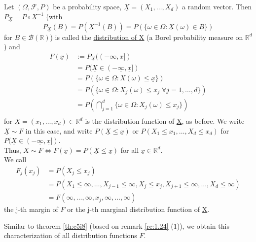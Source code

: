 \documentclass{article}
\newcommand{\R}{\mathbb{R}}
\newcommand{\inv}{^{-1}}
\begin{document}
	\begin{mydef}{}{}
		Let $(\Omega, \mathcal{F}, P)$ be a probability space, $\underline{X}=(X_1, \dots, X_d)$ a random vector. Then $P_{\underline{X}}=P\circ\underline{X}\inv$ (with $$P_{\underline{X}}(B)=P(\underline{X}\inv(B))=P(\{\omega\in\Omega : \underline{X}(\omega)\in B\})$$ for $B\in\mathcal{B}(\R)$) is called the \underline{distribution of \underline{X}} (a Borel probability measure on $\R^d$) and
		\begin{align*}
			F(\underline{x})&:=P_{\underline{X}}((-\infty, x])\\
			&=P(\underline{X}\in(-\underline{\infty}, \underline{x}])\\
			&=P(\{\omega\in\Omega : X(\omega)\leq\underline{x}\})\\
			&=P(\{\omega\in\Omega : X_j(\omega)\leq x_j\;\forall j=1, \dots, d\})\\
			&=P(\bigcap_{j=1}^{d}\{\omega\in\Omega : X_j(\omega)\leq x_j\})\\
		\end{align*}
		for $\underline{X}=(x_1, \dots, x_d)\in\R^d$ is the distribution function of \underline{X}, as before. We write $\underline{X}\sim F$ in this case, and write $P(\underline{X}\leq\underline{x})$ or $P(X_1\leq x_1, \dots, X_d\leq x_d)$ for $P(\underline{X}\in(-\underline{\infty}, \underline{x}])$.\\
		
		Thus, $X\sim F\Leftrightarrow F(\underline{x})=P(\underline{X}\leq\underline{x})$ for all $\underline{x}\in\R^d$.\\
		
		We call
		\begin{align*}
			F_j(x_j)&=P(X_j\leq x_j)\\
			&=P(X_1\leq\infty, \dots, X_{j-1}\leq\infty, X_j\leq x_j, X_{j+1}\leq\infty, \dots, X_d\leq\infty)\\
			&=F(\infty, \dots, \infty, x_j, \infty, \dots, \infty)
		\end{align*}
		the j-th margin of $F$ or the j-th marginal distribution function of \underline{X}.
	\end{mydef}
	
	Similar to theorem \ref{th:c5i8} (based on remark \ref{re:1.24} (1)), we obtain this characterization of all distribution functions $F$.
	
\end{document}
